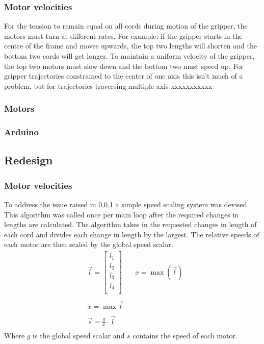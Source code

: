 \documentclass[conference]{IEEEtran}
\begin{document}
	\subsubsection{Motor velocities}\label{motor_vel_problem}
	For the tension to remain equal on all cords during motion of the gripper, the motors must turn at different rates. For example: if the gripper starts in the centre of the frame and moves upwards, the top two lengths will shorten and the bottom two cords will get longer. To maintain a uniform velocity of the gripper, the top two motors must slow down and the bottom two must speed up. For gripper trajectories constrained to the center of one axis this isn't much of a problem, but for trajectories traversing multiple axis xxxxxxxxxxx
	\subsubsection{Motors}
	\subsubsection{Arduino}
	\subsection{Redesign}
	\subsubsection{Motor velocities}\label{motor_speed_section}
	To address the issue raised in \ref{motor_vel_problem} a simple speed scaling system was devised. This algorithm was called once per main loop after the required changes in lengths are calculated. The algorithm takes in the requested changes in length of each cord and divides each change in length by the largest. The relative speeds of each motor are then scaled by the global speed scalar.
	\begin{equation}\label{motor_speed_equation}
	\begin{aligned}
	&\vec{l} = \begin{bmatrix}
	l_1\\l_2\\l_3\\l_4\\
	\end{bmatrix}\quad
	&x = \max\left(\vec{l}\right)\\\\
	&x = \max\vec{l}\\\\
	&\vec{s} = \frac{g}{x}\cdot \vec{l}\\
	\end{aligned}
	\end{equation}
	Where $g$ is the global speed scalar and $s$ contains the speed of each motor.
\end{document}
